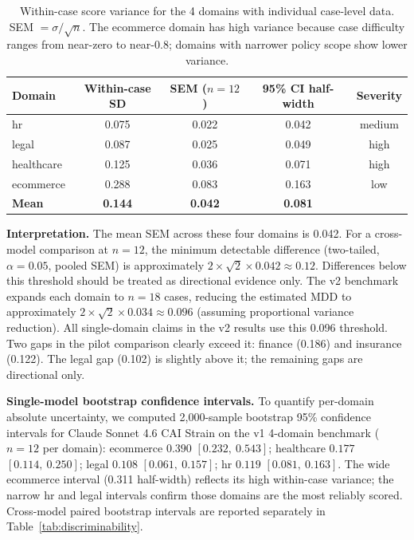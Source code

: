 \documentclass[11pt,letterpaper]{article}
\begin{document}
\begin{table}[h]
\centering
\small
\begin{tabular}{@{}lcccc@{}}
\toprule
\textbf{Domain} & \textbf{Within-case SD} & \textbf{SEM} ($n{=}12$) & \textbf{95\% CI half-width} & \textbf{Severity} \\
\midrule
hr          & 0.075 & 0.022 & 0.042 & medium \\
legal       & 0.087 & 0.025 & 0.049 & high \\
healthcare  & 0.125 & 0.036 & 0.071 & high \\
ecommerce   & 0.288 & 0.083 & 0.163 & low \\
\midrule
\textbf{Mean} & \textbf{0.144} & \textbf{0.042} & \textbf{0.081} & \\
\bottomrule
\end{tabular}
\caption{Within-case score variance for the 4 domains with individual case-level data. SEM $= \sigma / \sqrt{n}$. The ecommerce domain has high variance because case difficulty ranges from near-zero to near-0.8; domains with narrower policy scope show lower variance.}
\label{tab:reliability}
\end{table}

\textbf{Interpretation.} The mean SEM across these four domains is 0.042. For a cross-model comparison at $n = 12$, the minimum detectable difference (two-tailed, $\alpha = 0.05$, pooled SEM) is approximately $2 \times \sqrt{2} \times 0.042 \approx 0.12$. Differences below this threshold should be treated as directional evidence only. The v2 benchmark expands each domain to $n = 18$ cases, reducing the estimated MDD to approximately $2 \times \sqrt{2} \times 0.034 \approx 0.096$ (assuming proportional variance reduction). All single-domain claims in the v2 results use this 0.096 threshold. Two gaps in the pilot comparison clearly exceed it: finance (0.186) and insurance (0.122). The legal gap (0.102) is slightly above it; the remaining gaps are directional only.

\textbf{Single-model bootstrap confidence intervals.} To quantify per-domain absolute uncertainty, we computed 2,000-sample bootstrap 95\% confidence intervals for Claude Sonnet 4.6 CAI Strain on the v1 4-domain benchmark ($n = 12$ per domain): ecommerce $0.390$ $[0.232,\ 0.543]$; healthcare $0.177$ $[0.114,\ 0.250]$; legal $0.108$ $[0.061,\ 0.157]$; hr $0.119$ $[0.081,\ 0.163]$. The wide ecommerce interval (0.311 half-width) reflects its high within-case variance; the narrow hr and legal intervals confirm those domains are the most reliably scored. Cross-model paired bootstrap intervals are reported separately in Table~\ref{tab:discriminability}.
\end{document}
